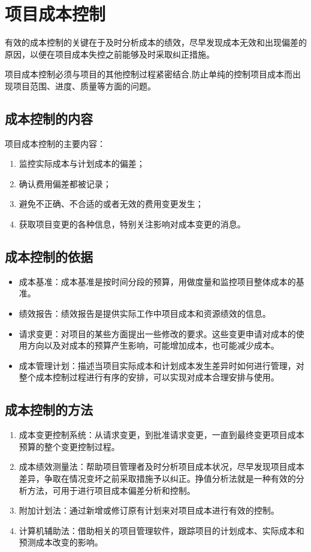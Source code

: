 \section{项目成本控制}
有效的成本控制的关键在于及时分析成本的绩效，尽早发现成本无效和出现偏差的原因，以便在项目成本失控之前能够及时采取纠正措施。
\par 项目成本控制必须与项目的其他控制过程紧密结合,防止单纯的控制项目成本而出现项目范围、进度、质量等方面的问题。
\subsection{成本控制的内容}
\par 项目成本控制的主要内容：
\begin{enumerate}
	\item 监控实际成本与计划成本的偏差；
	\item 确认费用偏差都被记录；
	\item 避免不正确、不合适的或者无效的费用变更发生；
	\item 获取项目变更的各种信息，特别关注影响对成本变更的消息。
\end{enumerate}
\subsection{成本控制的依据}
\begin{itemize}
	\item 成本基准：成本基准是按时间分段的预算，用做度量和监控项目整体成本的基准。
	\item 绩效报告：绩效报告是提供实际工作中项目成本和资源绩效的信息。
	\item 请求变更：对项目的某些方面提出一些修改的要求。这些变更申请对成本的使用方向以及对成本的预算产生影响，可能增加成本，也可能减少成本。
	\item 成本管理计划：描述当项目实际成本和计划成本发生差异时如何进行管理，对整个成本控制过程进行有序的安排，可以实现对成本合理安排与使用。
\end{itemize}
\subsection{成本控制的方法}
\begin{enumerate}
	\item 成本变更控制系统：从请求变更，到批准请求变更，一直到最终变更项目成本预算的整个变更控制过程。
	\item 成本绩效测量法：帮助项目管理者及时分析项目成本状况，尽早发现项目成本差异，争取在情况变坏之前采取措施予以纠正。挣值分析法就是一种有效的分析方法，可用于进行项目成本偏差分析和控制。
	\item 附加计划法：通过新增或修订原有计划来对项目成本进行有效的控制。
	\item 计算机辅助法：借助相关的项目管理软件，跟踪项目的计划成本、实际成本和预测成本改变的影响。
\end{enumerate}
